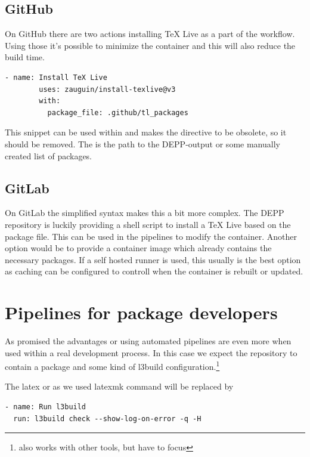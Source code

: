 \documentclass[final]{ltugboat}
\newcommand*{\directive}[1]{\textbf{\detokenize{#1}}}
\begin{document}
\subsection{GitHub}

On GitHub there are two actions installing TeX Live as a part of the workflow.
Using those it's possible to minimize the container and this will also reduce the build time.

\begin{verbatim}
- name: Install TeX Live
        uses: zauguin/install-texlive@v3
        with:
          package_file: .github/tl_packages
\end{verbatim}

This snippet can be used within \directive{steps:} and makes the \directive{container:} directive to be obsolete, so it should be removed.
The \directive{package_file:} is the path to the DEPP-output or some manually created list of packages.

 \subsection{GitLab}

 On GitLab the simplified syntax makes this a bit more complex.
 The DEPP repository is luckily providing a shell script to install a TeX Live based on the package file.
 This can be used in the pipelines to modify the container.
 Another option would be to provide a container image which already contains the necessary packages.
 If a self hosted runner is used, this usually is the best option as caching can be configured to controll when the container is rebuilt or updated.

\section{Pipelines for package developers}

As promised the advantages or using automated pipelines are even more when used within a real development process.
In this case we expect the repository to contain a package and some kind of l3build configuration.\footnote{also works with other tools, but have to focus}

The latex or as we used latexmk command will be replaced by

\begin{verbatim}
- name: Run l3build
  run: l3build check --show-log-on-error -q -H
\end{verbatim}
\end{document}

